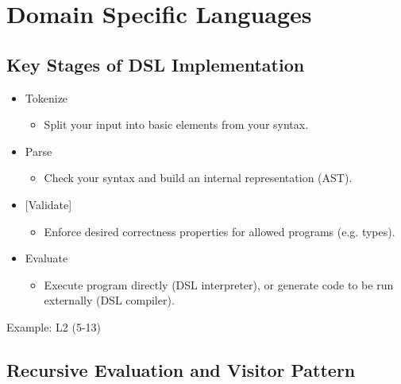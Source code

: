 \documentclass{article}
\begin{document}
\section{Domain Specific Languages}

\subsection{Key Stages of DSL Implementation}

\begin{itemize}
    \item Tokenize
    \begin{itemize}
        \item Split your input into basic elements from your syntax.
    \end{itemize}
    \item Parse
    \begin{itemize}
        \item Check your syntax and build an internal representation (AST).
    \end{itemize}
    \item {[Validate]}
    \begin{itemize}
        \item Enforce desired correctness properties for allowed programs (e.g. types).
    \end{itemize}
    \item Evaluate
    \begin{itemize}
        \item Execute program directly (DSL interpreter), or generate code to be run externally (DSL compiler).
    \end{itemize}
\end{itemize}

Example: L2 (5-13)

\subsection{Recursive Evaluation and Visitor Pattern}
\end{document}
